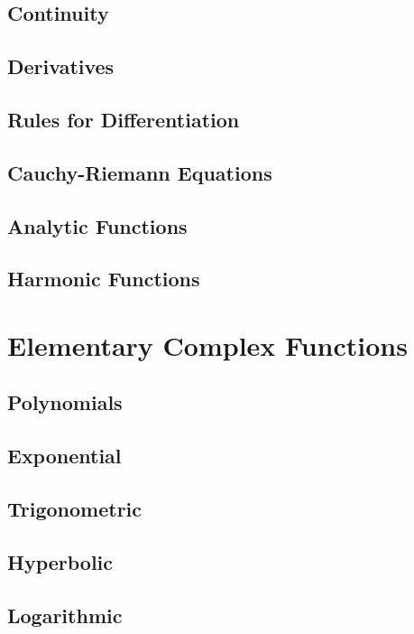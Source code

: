 \subsection{Continuity}

\subsection{Derivatives}

\subsection{Rules for Differentiation}

\subsection{Cauchy-Riemann Equations}

\subsection{Analytic Functions}

\subsection{Harmonic Functions}


\newpage
\section{Elementary Complex Functions}

\subsection{Polynomials}

\subsection{Exponential}

\subsection{Trigonometric}

\subsection{Hyperbolic}

\subsection{Logarithmic}


